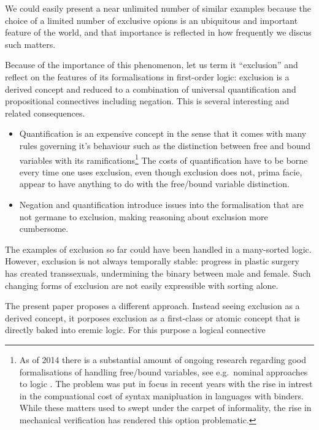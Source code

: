 \NI We could easily present a near unlimited number of similar
examples because the choice of a limited number of exclusive opions is
an ubiquitous and important feature of the world, and that importance
is reflected in how frequently we discus such matters.

Because of the importance of this phenomenon, let us term it
``exclusion'' and reflect on the features of its formalisations in
first-order logic: exclusion is a derived concept and reduced to a
combination of universal quantification and propositional connectives
including negation. This is several interesting and related
consequences.

\begin{itemize}


\item Quantification is an expensive concept in the sense that it comes with
      many rules governing it's behaviour such as the distinction
      between free and bound variables with its
      ramifications\footnote{As of 2014 there is a substantial amount
      of ongoing research regarding good formalisations of handling
      free/bound variables, see e.g.~nominal approaches to
      logic \cite{PittsAM:newaas,PittsAM:nomsetnasics}. The problem
      was put in focus in recent years with the rise in intrest in the
      compuational cost of syntax manipluation in languages with
      binders. While these matters used to swept under the carpet of
      informality, the rise in mechanical verification has rendered
      this option problematic.} The costs of quantification have to be
      borne every time one uses exclusion, even though exclusion does
      not, prima facie, appear to have anything to do with the
      free/bound variable distinction.

\item Negation and quantification introduce issues into the formalisation
      that are not germane to exclusion, making reasoning about
      exclusion more cumbersome.

\end{itemize}

\NI The examples of exclusion so far could have been handled in a
many-sorted logic. However, exclusion is not always temporally stable:
progress in plastic surgery has created transsexuals, undermining the
binary between male and female. Such changing forms of exclusion are
not easily expressible with sorting alone.

The present paper proposes a different approach. Instead seeing
exclusion as a derived concept, it porposes exclusion as a first-class
or atomic concept that is directly baked into eremic logic. For this
purpose a logical connective

